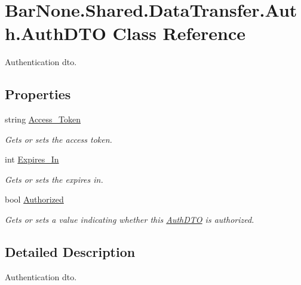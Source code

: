 \hypertarget{class_bar_none_1_1_shared_1_1_data_transfer_1_1_auth_1_1_auth_d_t_o}{}\section{Bar\+None.\+Shared.\+Data\+Transfer.\+Auth.\+Auth\+D\+TO Class Reference}
\label{class_bar_none_1_1_shared_1_1_data_transfer_1_1_auth_1_1_auth_d_t_o}


Authentication dto.  


\subsection*{Properties}
\begin{DoxyCompactItemize}
\item 
string \mbox{\hyperlink{class_bar_none_1_1_shared_1_1_data_transfer_1_1_auth_1_1_auth_d_t_o_a19f568c08a850e8f08659f03dd48f16d}{Access\+\_\+\+Token}}
\begin{DoxyCompactList}\small\item\em Gets or sets the access token. \end{DoxyCompactList}\item 
int \mbox{\hyperlink{class_bar_none_1_1_shared_1_1_data_transfer_1_1_auth_1_1_auth_d_t_o_a694bc6dee1dc5e5151b29e811b1025fc}{Expires\+\_\+\+In}}
\begin{DoxyCompactList}\small\item\em Gets or sets the expires in. \end{DoxyCompactList}\item 
bool \mbox{\hyperlink{class_bar_none_1_1_shared_1_1_data_transfer_1_1_auth_1_1_auth_d_t_o_aca338ac69532000856fd111d193d4cfb}{Authorized}}
\begin{DoxyCompactList}\small\item\em Gets or sets a value indicating whether this \mbox{\hyperlink{class_bar_none_1_1_shared_1_1_data_transfer_1_1_auth_1_1_auth_d_t_o}{Auth\+D\+TO}} is authorized. \end{DoxyCompactList}\end{DoxyCompactItemize}


\subsection{Detailed Description}
Authentication dto. 



